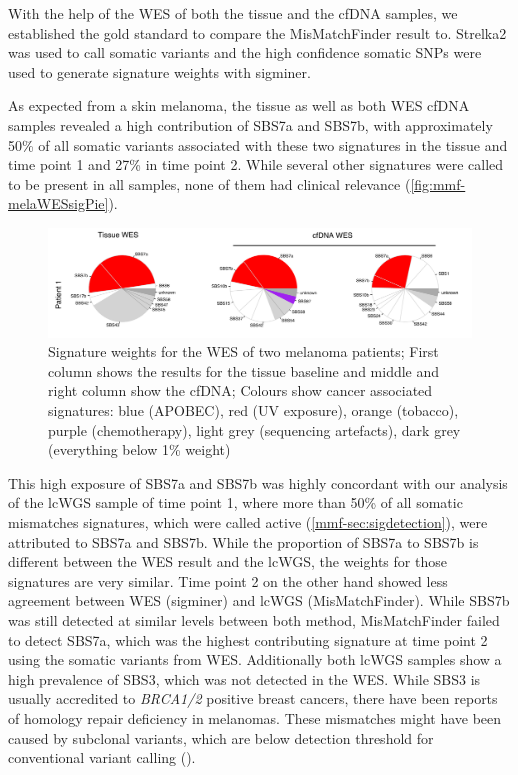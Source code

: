 With the help of the WES of both the tissue and the cfDNA samples, we established the gold standard to compare the MisMatchFinder result to.  Strelka2 was used to call somatic variants and the high confidence somatic SNPs were used to generate signature weights with sigminer.

As expected from a skin melanoma, the tissue as well as both WES cfDNA samples revealed a high contribution of SBS7a and SBS7b, with approximately 50\%  of all somatic variants associated with these two signatures in the tissue and time point 1 and 27\% in time point 2. While several other signatures were called to be present in all samples, none of them had clinical relevance (\autoref{fig:mmf-melaWESsigPie}).

\begin{figure}[ht]
\centering
\includegraphics[width=.99\linewidth]{Figures/MisMatchFinder/melanomaWESsignatures.pdf}
\caption[Signature weights for the WES of two melanoma patients]{Signature weights for the WES of two melanoma patients; First column shows the results for the tissue baseline and middle and right column show the cfDNA; Colours show cancer associated signatures: blue (APOBEC), red (UV exposure), orange (tobacco), purple (chemotherapy), light grey (sequencing artefacts), dark grey (everything below 1\% weight)}\label{fig:mmf-melaWESsigPie}
\end{figure}
 
This high exposure of SBS7a and SBS7b was highly concordant with our analysis of the lcWGS sample of time point 1, where more than 50\% of all somatic mismatches signatures, which were called active (\autoref{mmf-sec:sigdetection}), were attributed to SBS7a and SBS7b. While the proportion of SBS7a to SBS7b is different between the WES result and the lcWGS, the weights for those signatures are very similar. Time point 2 on the other hand showed less agreement between WES (sigminer) and lcWGS (MisMatchFinder). While SBS7b was still detected at similar levels between both method, MisMatchFinder failed to detect SBS7a, which was the highest contributing signature at time point 2 using the somatic variants from WES. Additionally both lcWGS samples show a high prevalence of SBS3, which was not detected in the WES. While SBS3 is usually accredited to \textit{BRCA1/2} positive breast cancers, there have been reports of homology repair deficiency in melanomas. These mismatches might have been caused by subclonal variants, which are below detection threshold for conventional variant calling ().

